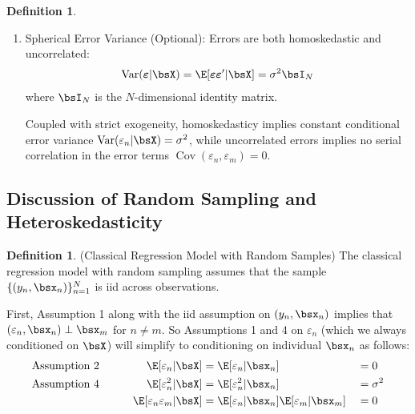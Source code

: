 \documentclass[12pt]{article}
\theoremstyle{plain}
\theoremstyle{definition}
\newtheorem{defn}[thm]{Definition}
\theoremstyle{remark}
\newcommand{\bsvarepsilon}{\boldsymbol{\varepsilon}}
\newcommand{\Cov}{\operatorname{Cov}}
\newcommand{\Var}{\operatorname{Var}}
\newcommand{\nN}{_{n=1}^N}
\begin{document}
\begin{defn}
\begin{enumerate}
  \item Spherical Error Variance (Optional): Errors are both
    homoskedastic and uncorrelated:
    \begin{align*}
      \Var(\bsvarepsilon|\bsX) =
      \E[\bsvarepsilon\bsvarepsilon'|\bsX] = \sigma^2\bsI_N
    \end{align*}
    where $\bsI_N$ is the $N$-dimensional identity matrix.

    Coupled with strict exogeneity, homoskedasticy implies constant
    conditional error variance $\Var(\varepsilon_n|\bsX)=\sigma^2$,
    while uncorrelated errors implies no serial correlation
    in the error terms $\Cov(\varepsilon_n,\varepsilon_m)=0$.
\end{enumerate}
\end{defn}

\clearpage
\subsection{Discussion of Random Sampling and Heteroskedasticity}
\label{sec:discusshetero}

\begin{defn}(Classical Regression Model with Random Samples)
The classical regression model with random sampling assumes that the
sample $\{(y_n,\bsx_n)\}\nN$ is iid across observations.

First, Assumption 1 along with the iid assumption on
$(y_n,\bsx_n)$ implies that $(\varepsilon_n, \bsx_n)\perp \bsx_m$ for
$n\neq m$.
So Assumptions 1 and 4 on $\varepsilon_n$ (which we always
conditioned on $\bsX$) will simplify to conditioning on individual
$\bsx_n$ as follows:
\begin{alignat*}{5}
  \text{Assumption 2} &&\qquad
   \E[\varepsilon_n | \bsX] &=
   \E[\varepsilon_n | \bsx_n] &&= 0\\
  \text{Assumption 4} &&\qquad
   \E[\varepsilon_n^2 | \bsX] &=
   \E[\varepsilon_n^2 | \bsx_n] &&= \sigma^2\\
  \text{} &&\qquad
   \E[\varepsilon_n\varepsilon_m|\bsX] &=
   \E[\varepsilon_n|\bsx_n] \E[\varepsilon_m|\bsx_m]
   &&=0
\end{alignat*}
\end{defn}
\end{document}
